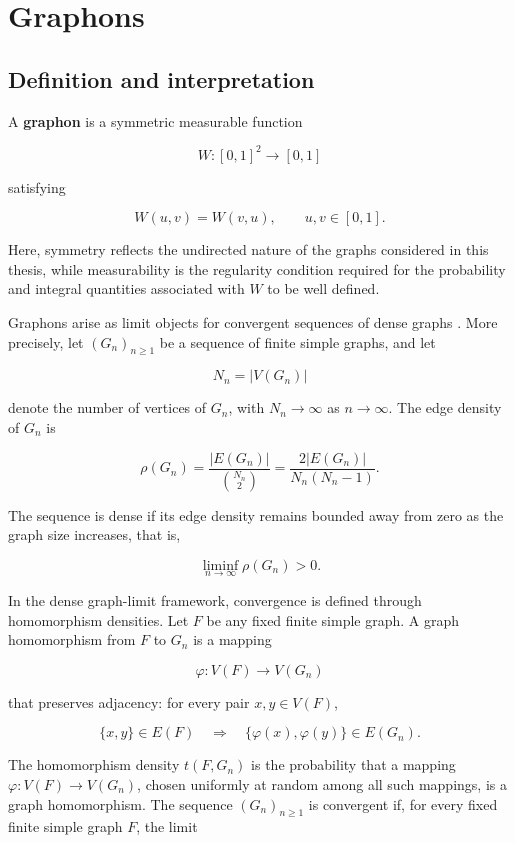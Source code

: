\section{Graphons}
\label{sec:graphons}

\subsection{Definition and interpretation}
\label{subsec:graphon_definition}

A \textbf{graphon} is a symmetric measurable function

\[
W:[0,1]^2\rightarrow[0,1]
\]

satisfying

\[
W(u,v)=W(v,u),
\qquad u,v\in[0,1].
\]

Here, symmetry reflects the undirected nature of the graphs considered in this thesis, while measurability is the regularity condition required for the probability and integral quantities associated with \(W\) to be well defined.

Graphons arise as limit objects for convergent sequences of dense graphs \cite{lovasz2006limits}. More precisely, let \((G_n)_{n\geq 1}\) be a sequence of finite simple graphs, and let

\[
N_n=|V(G_n)|
\]

denote the number of vertices of \(G_n\), with \(N_n\to\infty\) as \(n\to\infty\). The edge density of \(G_n\) is

\[
\rho(G_n)
=
\frac{|E(G_n)|}{\binom{N_n}{2}}
=
\frac{2|E(G_n)|}{N_n(N_n-1)}.
\]

The sequence is dense if its edge density remains bounded away from zero as the graph size increases, that is,

\[
\liminf_{n\to\infty}\rho(G_n)>0.
\]

In the dense graph-limit framework, convergence is defined through homomorphism densities. Let \(F\) be any fixed finite simple graph. A graph homomorphism from \(F\) to \(G_n\) is a mapping

\[
\varphi:V(F)\rightarrow V(G_n)
\]

that preserves adjacency: for every pair \(x,y\in V(F)\),

\[
\{x,y\}\in E(F)
\quad\Longrightarrow\quad
\{\varphi(x),\varphi(y)\}\in E(G_n).
\]

The homomorphism density \(t(F,G_n)\) is the probability that a mapping
\(\varphi:V(F)\to V(G_n)\), chosen uniformly at random among all such mappings, is a graph homomorphism. The sequence \((G_n)_{n\geq 1}\) is convergent if, for every fixed finite simple graph \(F\), the limit

